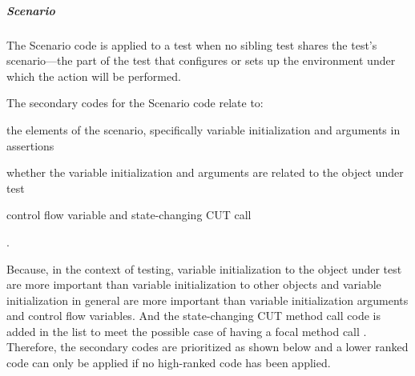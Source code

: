 \subparagraph{Scenario}

The Scenario code is applied to a test when no sibling test shares the test’s scenario---the part of the test that configures or sets up the environment under which the action will be performed.

The secondary codes for the Scenario code relate to:
\begin{enumerate*}[label=(\roman*)]
\item the elements of the scenario, specifically variable initialization and arguments in assertions
\item whether the variable initialization and arguments are related to the object under test
\item control flow variable and state-changing CUT call
\end{enumerate*}.

Because, in the context of testing, variable initialization to the object under test are more important than variable initialization to other objects and variable initialization in general are more important than variable initialization arguments and control flow variables.
%
And the state-changing CUT method call code is added in the list to meet the possible case of having a focal method call \cite{ghafari2015automatically}.
%
Therefore, the secondary codes are prioritized as shown below and a lower ranked code can only be applied if no high-ranked code has been applied.

